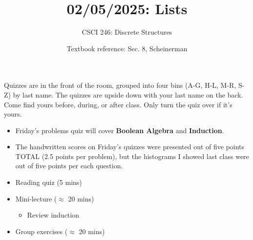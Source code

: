 \documentclass[10pt]{beamer}
\begin{document}






\title{02/05/2025: Lists}
\author{CSCI 246: Discrete Structures}
\date{Textbook reference: Sec. 8, Scheinerman}

\begin{frame}
    \titlepage 
\end{frame}


\begin{frame}
\footnotesize 

\begin{mygreenbox}[title=Graded Quiz Pickup]
Quizzes are in the front of the room, grouped into four bins (A-G, H-L, M-R, S-Z) by last name. The quizzes are upside down with your last name on the back. Come find yours before, during, or after class.  Only turn the quiz over if it's yours.
\end{mygreenbox} 
\vfill 

\begin{myredbox}[title=Announcements]

\begin{itemize}
\item Friday's problems quiz will cover \textbf{Boolean Algebra} and \textbf{Induction}.
\item The handwritten scores on Friday's quizzes were presented out of five points TOTAL (2.5 points per problem), but the histograms I showed last class were out of five points per each question.   
\end{itemize}

\end{myredbox}

\vfill 


\begin{myyellowbox}[title=Today's Agenda]
\begin{itemize}
	\item Reading quiz  (5 mins)
	\item Mini-lecture ($\approx$ 20 mins)
	\begin{itemize}
	\footnotesize 
	\item Review induction 
	\end{itemize}
	\item Group exercises ($\approx$ 20 mins)
\end{itemize}

\end{myyellowbox}
\vfill 

\end{frame}
\end{document}

